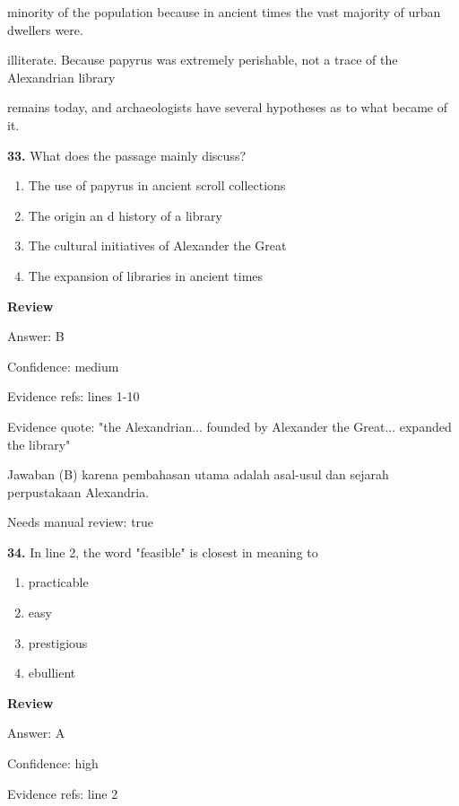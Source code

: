 \documentclass[12pt]{article}
\begin{document}
minority of the population because in ancient times the vast majority of urban dwellers were.\par
illiterate. Because papyrus was extremely perishable, not a trace of the Alexandrian library\par
remains today, and archaeologists have several hypotheses as to what became of it.\par
\endgroup
\medskip
\noindent\textbf{33.} What does the passage mainly discuss?
\begin{enumerate}[label=(\Alph*),leftmargin=*,itemsep=0.2em]
\item The use of papyrus in ancient scroll collections
\item The origin an d history of a library
\item The cultural initiatives of Alexander the Great
\item The expansion of libraries in ancient times
\end{enumerate}
\par
\begingroup
\setlength{\parskip}{0pt}
\setlength{\parindent}{0pt}
\textbf{Review}\par
Answer: B\par
Confidence: medium\par
Evidence refs: lines 1-10\par
Evidence quote: "the Alexandrian... founded by Alexander the Great... expanded the library"\par
Jawaban (B) karena pembahasan utama adalah asal-usul dan sejarah perpustakaan Alexandria.\par
Needs manual review: true\par
\endgroup
\par
\vspace{0.25\baselineskip}
\noindent\textbf{34.} In line 2, the word "feasible" is closest in meaning to
\begin{enumerate}[label=(\Alph*),leftmargin=*,itemsep=0.2em]
\item practicable
\item easy
\item prestigious
\item ebullient
\end{enumerate}
\par
\begingroup
\setlength{\parskip}{0pt}
\setlength{\parindent}{0pt}
\textbf{Review}\par
Answer: A\par
Confidence: high\par
Evidence refs: line 2\par
\end{document}
